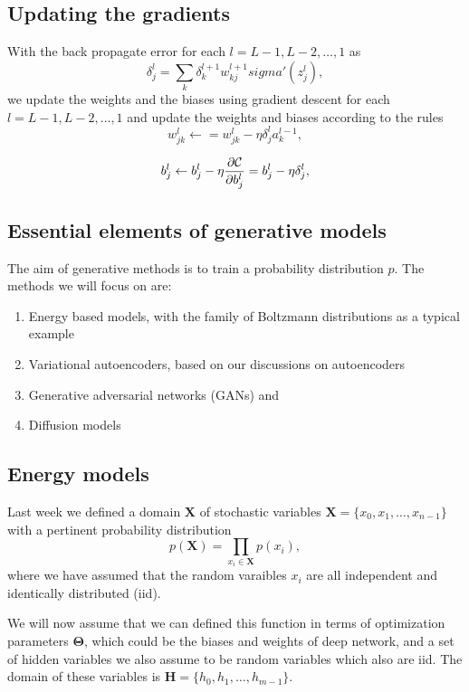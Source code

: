 \documentclass[%
oneside,                 %
final,                   %
10pt]{article}
\begin{document}
\subsection{Updating the gradients}

With the back propagate error for each $l=L-1,L-2,\dots,1$ as
\[
\delta_j^l = \sum_k \delta_k^{l+1}w_{kj}^{l+1}sigma'(z_j^l),
\]
we update the weights and the biases using gradient descent for each $l=L-1,L-2,\dots,1$ and update the weights and biases according to the rules
\[
w_{jk}^l\leftarrow  = w_{jk}^l- \eta \delta_j^la_k^{l-1},
\]

\[
b_j^l \leftarrow b_j^l-\eta \frac{\partial {\cal C}}{\partial b_j^l}=b_j^l-\eta \delta_j^l,
\]

\subsection{Essential elements of generative models}

The aim of generative methods is to train a probability distribution $p$. The methods we will focus on are:
\begin{enumerate}
\item Energy based models, with the family of Boltzmann distributions as a typical example

\item Variational autoencoders, based on our discussions on autoencoders

\item Generative adversarial networks (GANs) and

\item Diffusion models
\end{enumerate}

\noindent
\subsection{Energy models}

Last week we defined a domain $\bm{X}$ of stochastic variables $\bm{X}= \{x_0,x_1, \dots , x_{n-1}\}$ with a pertinent probability distribution
\[
p(\bm{X})=\prod_{x_i\in \bm{X}}p(x_i),
\]
where we have assumed that the random varaibles $x_i$ are all independent and identically distributed (iid).

We will now assume that we can defined this function in terms of optimization parameters $\bm{\Theta}$, which could be the biases and weights of deep network, and a set of hidden variables we also assume to be random variables which also are iid. The domain of these variables is
$\bm{H}= \{h_0,h_1, \dots , h_{m-1}\}$.
\end{document}

